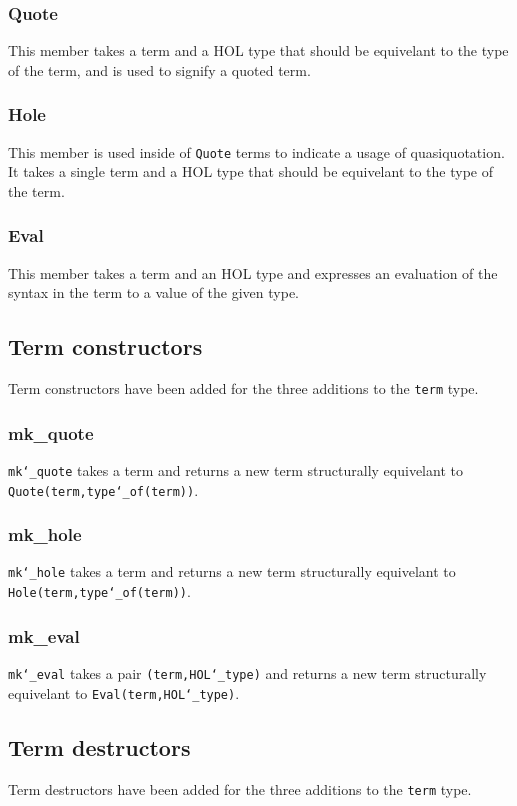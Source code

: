 \documentclass{article}
\def\c#1{\texttt{#1}}
\begin{document}
\subsubsection{Quote}
This member takes a term and a HOL type that should be equivelant to the type of the term, and is used to signify a quoted term.

\subsubsection{Hole}
This member is used inside of \c{Quote} terms to indicate a usage of quasiquotation. It takes a single term and a HOL type that should be equivelant to the type of the term.

\subsubsection{Eval}
This member takes a term and an HOL type and expresses an evaluation of the syntax in the term to a value of the given type.

\subsection{Term constructors}
Term constructors have been added for the three additions to the \c{term} type.

\subsubsection{mk\_quote}
\c{mk\char`\_quote} takes a term and returns a new term structurally equivelant to \c{Quote(term,type\char`\_of(term))}.

\subsubsection{mk\_hole}
\c{mk\char`\_hole} takes a term and returns a new term structurally equivelant to \c{Hole(term,type\char`\_of(term))}.

\subsubsection{mk\_eval}
\c{mk\char`\_eval} takes a pair \c{(term,HOL\char`\_type)} and returns a new term structurally equivelant to \c{Eval(term,HOL\char`\_type)}.

\subsection{Term destructors}
Term destructors have been added for the three additions to the \c{term} type.
\end{document}
